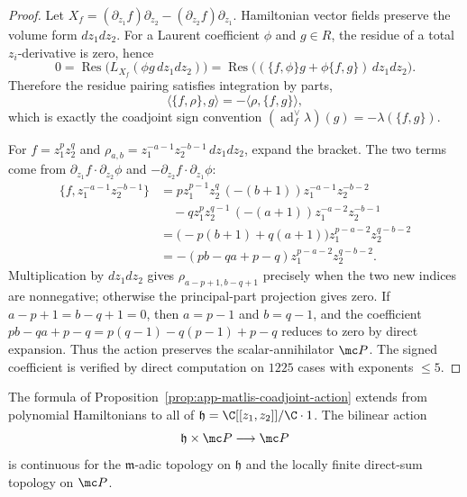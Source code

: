 \begin{proof}
  Let \(X_f=(\partial_{z_1}f)\partial_{z_2}
  -(\partial_{z_2}f)\partial_{z_1}\).  Hamiltonian vector fields preserve
  the volume form \(dz_1dz_2\).  For a Laurent coefficient \(\phi\) and
  \(g\in R\), the residue of a total \(z_i\)-derivative is zero, hence
  \[
    0=\operatorname{Res}\bigl(L_{X_f}(\phi g\,dz_1dz_2)\bigr)
      =\operatorname{Res}\bigl((\{f,\phi\}g+\phi\{f,g\})\,dz_1dz_2\bigr).
  \]
  Therefore the residue pairing satisfies integration by parts,
  \[
    \langle \{f,\rho\},g\rangle
      =-\langle \rho,\{f,g\}\rangle ,
  \]
  which is exactly the coadjoint sign convention
  \((\operatorname{ad}^{\vee}_f\lambda)(g)=-\lambda(\{f,g\})\).

  For \(f=z_1^p z_2^q\) and
  \(\rho_{a,b}=z_1^{-a-1}z_2^{-b-1}\,dz_1dz_2\), expand the bracket.
  The two terms come from \(\partial_{z_1}f\cdot\partial_{z_2}\phi\)
  and \(-\partial_{z_2}f\cdot\partial_{z_1}\phi\):
  \[
  \begin{aligned}
    \{f,z_1^{-a-1}z_2^{-b-1}\}
      &=
      pz_1^{p-1}z_2^q\,(-(b+1))z_1^{-a-1}z_2^{-b-2}  \\
      &\quad
      -qz_1^p z_2^{q-1}\,(-(a+1))z_1^{-a-2}z_2^{-b-1} \\
      &=\bigl(-p(b+1)+q(a+1)\bigr)z_1^{p-a-2}z_2^{q-b-2} \\
      &=-(pb-qa+p-q)z_1^{p-a-2}z_2^{q-b-2}.
  \end{aligned}
  \]
  Multiplication by \(dz_1dz_2\) gives
  \(\rho_{a-p+1,b-q+1}\) precisely when the two new indices are
  nonnegative; otherwise the principal-part projection gives zero.  If
  \(a-p+1=b-q+1=0\), then \(a=p-1\) and \(b=q-1\), and the coefficient
  \(pb-qa+p-q=p(q-1)-q(p-1)+p-q\) reduces to zero by direct expansion.
  Thus the action preserves the scalar-annihilator \(\mc P\).  The
  signed coefficient is verified by direct computation on \(1225\)
  cases with exponents \(\le 5\).
\end{proof}

\begin{lem}
\label{lem:app-matlis-coadjoint-continuity}
  The formula of Proposition~\ref{prop:app-matlis-coadjoint-action}
  extends from polynomial Hamiltonians to all of
  \(\mathfrak h=\C[[z_1,z_2]]/\C\cdot1\).  The bilinear action
  \[
    \mathfrak h\times\mc P\longrightarrow\mc P
  \]
  is continuous for the \(\mathfrak m\)-adic topology on \(\mathfrak h\)
  and the locally finite direct-sum topology on \(\mc P\).
\end{lem}

